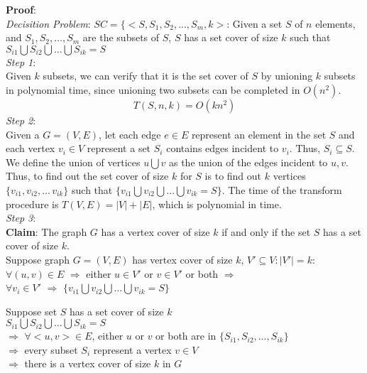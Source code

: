 \documentclass{article}%
\begin{document}
\begin{enumerate}
  \textbf{Proof}:\\
  \emph{Decisition Problem}: $SC=\{<S,S_{1},S_{2},...,S_{m},k>$: Given a set $S$ of $n$ elements, and $S_{1},S_{2},\ldots,S_{m}$ are the subsets of $S$, $S$ has a set cover of size $k$ such that $S_{i1} \bigcup S_{i2} \bigcup \ldots \bigcup S_{ik}=S$\\
  
  \emph{Step 1}:\\
  Given $k$ subsets, we can verify that it is the set cover of $S$ by unioning $k$ subsets in polynomial time, since unioning two subsets can be completed in $O(n^{2})$.
  $$T(S,n,k) = O(kn^{2})$$
  \emph{Step 2}:\\
  Given a $G=(V,E)$, let each edge $e \in E$ represent an element in the set $S$ and each vertex $v_{i} \in V$ represent a set $S_{i}$ contains edges incident to $v_{i}$. Thus, $S_{i} \subseteq S$. We define the union of vertices $u \bigcup v$ as the union of the edges incident to $u,v$. Thus, to find out the set cover of size $k$ for $S$ is to find out $k$ vertices $\{v_{i1}, v_{i2}, \ldots \,v_{ik}\}$ such that $\{v_{i1} \bigcup v_{i2} \bigcup \ldots \bigcup v_{ik}=S\}$. The time of the transform procedure is $T(V,E) = |V| + |E|$, which is polynomial in time.\\
  \emph{Step 3}:\\
  \textbf{Claim}: The graph $G$ has a vertex cover of size $k$ if and only if the set $S$ has a set cover of size $k$.\\
  Suppose graph $G=(V,E)$ has vertex cover of size $k$, $V' \subseteq V:|V'|=k$:\\
  $\forall (u,v) \in E$ $\Rightarrow$ either $u \in V'$ or $v \in V'$ or both $\Rightarrow$ \\ 
  $\forall v_{i} \in V'$ $\Rightarrow$  $\{v_{i1} \bigcup v_{i2} \bigcup \ldots \bigcup v_{ik}=S\}$ 
  
  Suppose set $S$ has a set cover of size $k$\\
  $S_{i1} \bigcup S_{i2} \bigcup \ldots \bigcup S_{ik}=S$ \\ 
  $\Rightarrow$ $\forall <u,v> \in E$, either $u$ or $v$ or both are in $\{S_{i1}, S_{i2},\ldots,S_{ik}\}$ \\
  $\Rightarrow$ every subset $S_{i}$ represent a vertex $v \in V$\\
  $\Rightarrow$ there is a vertex cover of size $k$ in $G$ 
  

\end{enumerate}
\end{document}
